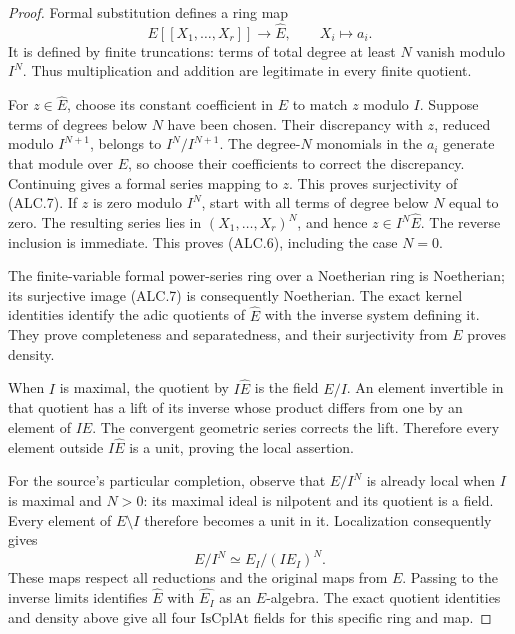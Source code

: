 \begin{proof}
Formal substitution defines a ring map
\[
 E[[X_1,\ldots,X_r]]\longrightarrow\widehat E,
                \qquad X_i\longmapsto a_i.           \tag{ALC.7}
\]
It is defined by finite truncations: terms of total degree at
least \(N\) vanish modulo \(I^N\).  Thus multiplication
and addition are legitimate in every finite quotient.

For \(z\in\widehat E\), choose its constant coefficient
in \(E\) to match \(z\) modulo \(I\).  Suppose terms of
degrees below \(N\) have been chosen.  Their discrepancy
with \(z\), reduced modulo \(I^{N+1}\), belongs to
\(I^N/I^{N+1}\).  The degree-\(N\) monomials in the
\(a_i\) generate that module over \(E\), so choose their
coefficients to correct the discrepancy.  Continuing gives a
formal series mapping to \(z\).  This proves surjectivity of
(ALC.7).  If \(z\) is zero modulo \(I^N\), start with all
terms of degree below \(N\) equal to zero.  The resulting
series lies in \((X_1,\ldots,X_r)^N\), and hence
\(z\in I^N\widehat E\).  The reverse inclusion is immediate.
This proves (ALC.6), including the case \(N=0\).

The finite-variable formal power-series ring over a Noetherian
ring is Noetherian; its surjective image (ALC.7) is consequently
Noetherian.  The exact kernel identities identify the adic
quotients of \(\widehat E\) with the inverse system defining
it.  They prove completeness and separatedness, and their
surjectivity from \(E\) proves density.

When \(I\) is maximal, the quotient by \(I\widehat E\) is
the field \(E/I\).  An element invertible in that quotient
has a lift of its inverse whose product differs from one by
an element of \(I\widehat E\).  The convergent geometric
series corrects the lift.  Therefore every element outside
\(I\widehat E\) is a unit, proving the local assertion.

For the source's particular completion, observe that
\(E/I^N\) is already local when \(I\) is maximal and
\(N>0\): its maximal ideal is nilpotent and its quotient
is a field.  Every element of \(E\setminus I\) therefore
becomes a unit in it.  Localization consequently gives
\[
        E/I^N\simeq E_I/(IE_I)^N.
\]
These maps respect all reductions and the original maps
from \(E\).  Passing to the inverse limits identifies
\(\widehat E\) with \(\widehat{E_I}\) as an
\(E\)-algebra.  The exact quotient identities and density
above give all four \(\mathrm{IsCplAt}\) fields for this
specific ring and map.
\end{proof}

